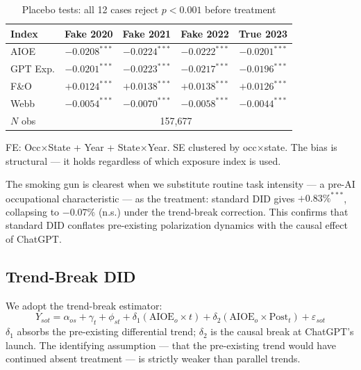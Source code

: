 \documentclass[12pt,a4paper]{article}
\begin{document}
\begin{table}[H]
\centering
\caption{Placebo tests: all 12 cases reject $p<0.001$ before treatment}
\label{tab:placebo}
\small
\begin{tabular}{lcccc}
\toprule
\textbf{Index} & \textbf{Fake 2020} & \textbf{Fake 2021} & \textbf{Fake 2022} & \textbf{True 2023} \\
\midrule
AIOE     & $-0.0208^{***}$ & $-0.0224^{***}$ & $-0.0222^{***}$ & $-0.0201^{***}$ \\
GPT Exp. & $-0.0201^{***}$ & $-0.0223^{***}$ & $-0.0217^{***}$ & $-0.0196^{***}$ \\
F\&O     & $+0.0124^{***}$ & $+0.0138^{***}$ & $+0.0138^{***}$ & $+0.0126^{***}$ \\
Webb     & $-0.0054^{***}$ & $-0.0070^{***}$ & $-0.0058^{***}$ & $-0.0044^{***}$ \\
\midrule
$N$ obs  & \multicolumn{4}{c}{157,677} \\
\bottomrule
\end{tabular}
\begin{flushleft}
\footnotesize FE: Occ$\times$State + Year + State$\times$Year. SE clustered by occ$\times$state. The bias is structural — it holds regardless of which exposure index is used.
\end{flushleft}
\end{table}

The smoking gun is clearest when we substitute routine task intensity — a pre-AI occupational characteristic — as the treatment: standard DID gives $+0.83\%^{***}$, collapsing to $-0.07\%$ (n.s.) under the trend-break correction. This confirms that standard DID conflates pre-existing polarization dynamics with the causal effect of ChatGPT.

\subsection{Trend-Break DID}

We adopt the \citet{wolfers2006} trend-break estimator:
\begin{equation}
Y_{sot} = \alpha_{os} + \gamma_t + \phi_{st} + \delta_1(\text{AIOE}_o \times t) + \delta_2(\text{AIOE}_o \times \text{Post}_t) + \varepsilon_{sot}
\label{eq:tb}
\end{equation}
$\delta_1$ absorbs the pre-existing differential trend; $\delta_2$ is the causal break at ChatGPT's launch. The identifying assumption — that the pre-existing trend would have continued absent treatment — is strictly weaker than parallel trends.
\end{document}
